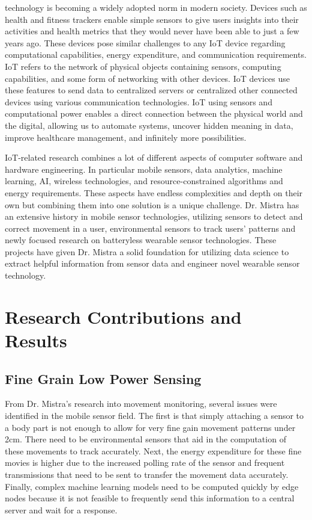 \documentclass[journal,onecolumn]{IEEEtran}
\begin{document}
 technology is becoming a widely adopted norm in modern society. Devices such as health and fitness trackers enable simple sensors to give users insights into their activities and health metrics that they would never have been able to just a few years ago. These devices pose similar challenges to any IoT device regarding computational capabilities, energy expenditure, and communication requirements. IoT refers to the network of physical objects containing sensors, computing capabilities, and some form of networking with other devices. IoT devices use these features to send data to centralized servers or centralized other connected devices using various communication technologies. IoT using sensors and computational power enables a direct connection between the physical world and the digital, allowing us to automate systems, uncover hidden meaning in data, improve healthcare management, and infinitely more possibilities. 

IoT-related research combines a lot of different aspects of computer software and hardware engineering. In particular mobile sensors, data analytics, machine learning, AI, wireless technologies, and resource-constrained algorithms and energy requirements. These aspects have endless complexities and depth on their own but combining them into one solution is a unique challenge. Dr. Mistra has an extensive history in mobile sensor technologies, utilizing sensors to detect and correct movement in a user, environmental sensors to track users' patterns and newly focused research on batteryless wearable sensor technologies. These projects have given Dr. Mistra a solid foundation for utilizing data science to extract helpful information from sensor data and engineer novel wearable sensor technology. 

\section{Research Contributions and Results}

\subsection{Fine Grain Low Power Sensing}

From Dr. Mistra's research into movement monitoring, several issues were identified in the mobile sensor field. The first is that simply attaching a sensor to a body part is not enough to allow for very fine gain movement patterns under 2cm. There need to be environmental sensors that aid in the computation of these movements to track accurately. Next, the energy expenditure for these fine movies is higher due to the increased polling rate of the sensor and frequent transmissions that need to be sent to transfer the movement data accurately. Finally, complex machine learning models need to be computed quickly by edge nodes because it is not feasible to frequently send this information to a central server and wait for a response. 
\end{document}
